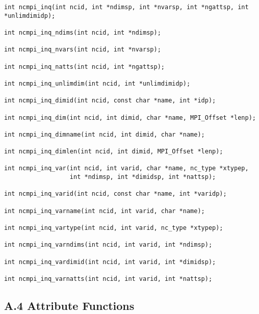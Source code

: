 \begin{verbatim}
int ncmpi_inq(int ncid, int *ndimsp, int *nvarsp, int *ngattsp, int *unlimdimidp);

int ncmpi_inq_ndims(int ncid, int *ndimsp);

int ncmpi_inq_nvars(int ncid, int *nvarsp);

int ncmpi_inq_natts(int ncid, int *ngattsp);

int ncmpi_inq_unlimdim(int ncid, int *unlimdimidp);

int ncmpi_inq_dimid(int ncid, const char *name, int *idp);

int ncmpi_inq_dim(int ncid, int dimid, char *name, MPI_Offset *lenp);

int ncmpi_inq_dimname(int ncid, int dimid, char *name);

int ncmpi_inq_dimlen(int ncid, int dimid, MPI_Offset *lenp);

int ncmpi_inq_var(int ncid, int varid, char *name, nc_type *xtypep,
                  int *ndimsp, int *dimidsp, int *nattsp);

int ncmpi_inq_varid(int ncid, const char *name, int *varidp);

int ncmpi_inq_varname(int ncid, int varid, char *name);

int ncmpi_inq_vartype(int ncid, int varid, nc_type *xtypep);

int ncmpi_inq_varndims(int ncid, int varid, int *ndimsp);

int ncmpi_inq_vardimid(int ncid, int varid, int *dimidsp);

int ncmpi_inq_varnatts(int ncid, int varid, int *nattsp);

\end{verbatim}

%
%
\subsection*{A.4  Attribute Functions}

